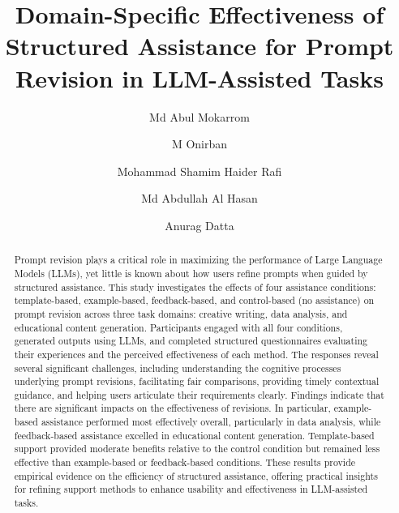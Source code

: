 \documentclass[acmlarge]{acmart}
\begin{document}
 

\title{Domain-Specific Effectiveness of Structured Assistance for Prompt Revision in LLM-Assisted Tasks}


\author{Md Abul Mokarrom}

\author{M Onirban}

\author{Mohammad Shamim Haider Rafi}

\author{Md Abdullah Al Hasan}

\author{Anurag Datta}

\renewcommand{\shortauthors}{Mokarrom, Onirban, Rafi, Hasan, and Datta}

\begin{abstract}
Prompt revision plays a critical role in maximizing the performance of Large Language Models (LLMs), yet little is known about how users refine prompts when guided by structured assistance. This study investigates the effects of four assistance conditions: template-based, example-based, feedback-based, and control-based (no assistance) on prompt revision across three task domains: creative writing, data analysis, and educational content generation. Participants engaged with all four conditions, generated outputs using LLMs, and completed structured questionnaires evaluating their experiences and the perceived effectiveness of each method. The responses reveal several significant challenges, including understanding the cognitive processes underlying prompt revisions, facilitating fair comparisons, providing timely contextual guidance, and helping users articulate their requirements clearly. Findings indicate that there are significant impacts on the effectiveness of revisions. In particular, example-based assistance performed most effectively overall, particularly in data analysis, while feedback-based assistance excelled in educational content generation. Template-based support provided moderate benefits relative to the control condition but remained less effective than example-based or feedback-based conditions. These results provide empirical evidence on the efficiency of structured assistance, offering practical insights for refining support methods to enhance usability and effectiveness in LLM-assisted tasks.
\end{abstract}
\end{document}
